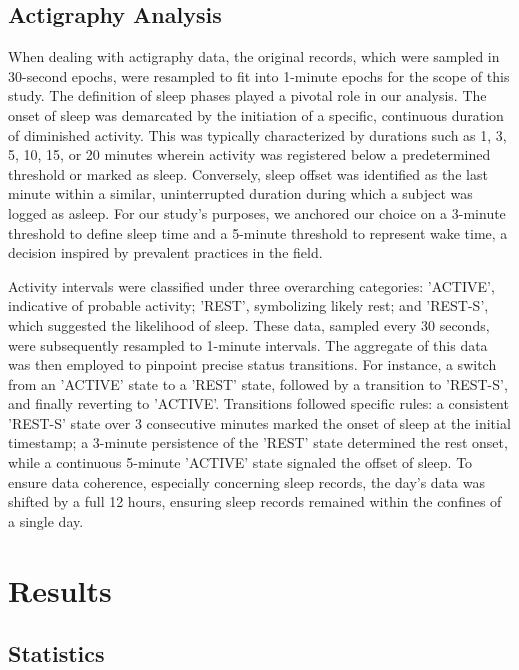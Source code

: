 \documentclass[journal, onecolumn, 11pt]{IEEEtran}
\begin{document}
\subsection{Actigraphy Analysis}

When dealing with actigraphy data, the original records, which were sampled in 30-second epochs, were resampled to fit into 1-minute epochs for the scope of this study. The definition of sleep phases played a pivotal role in our analysis. The onset of sleep was demarcated by the initiation of a specific, continuous duration of diminished activity. This was typically characterized by durations such as 1, 3, 5, 10, 15, or 20 minutes wherein activity was registered below a predetermined threshold or marked as sleep. Conversely, sleep offset was identified as the last minute within a similar, uninterrupted duration during which a subject was logged as asleep. For our study's purposes, we anchored our choice on a 3-minute threshold to define sleep time and a 5-minute threshold to represent wake time, a decision inspired by prevalent practices in the field.

Activity intervals were classified under three overarching categories: 'ACTIVE', indicative of probable activity; 'REST', symbolizing likely rest; and 'REST-S', which suggested the likelihood of sleep. These data, sampled every 30 seconds, were subsequently resampled to 1-minute intervals. The aggregate of this data was then employed to pinpoint precise status transitions. For instance, a switch from an 'ACTIVE' state to a 'REST' state, followed by a transition to 'REST-S', and finally reverting to 'ACTIVE'. Transitions followed specific rules: a consistent 'REST-S' state over 3 consecutive minutes marked the onset of sleep at the initial timestamp; a 3-minute persistence of the 'REST' state determined the rest onset, while a continuous 5-minute 'ACTIVE' state signaled the offset of sleep. To ensure data coherence, especially concerning sleep records, the day's data was shifted by a full 12 hours, ensuring sleep records remained within the confines of a single day.

\section{Results}

\subsection{Statistics}
\end{document}
